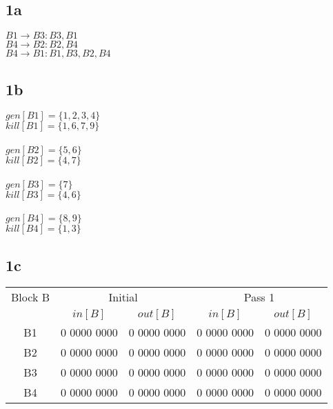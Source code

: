 \documentclass[10pt,a4paper]{article}
\author{Lucas Swartsenburg\\6174388}
\begin{document}
\subsection*{1a}
$B1 \rightarrow B3:{B3,B1}$ \\
$B4 \rightarrow B2:{B2,B4}$ \\
$B4 \rightarrow B1:{B1,B3,B2,B4}$

\subsection*{1b}
$gen[B1]= \{1,2,3,4\} $\\
$kill[B1]= \{1,6,7,9\} $\\
\\
$gen[B2]= \{5,6\} $\\
$kill[B2]= \{4,7\} $\\
\\
$gen[B3]= \{7\} $\\
$kill[B3]= \{4,6\} $\\
\\
$gen[B4]= \{8,9\} $\\
$kill[B4]= \{1,3\} $\\

\subsection*{1c}
\begin{tabular}{|c|c|c|c|c|}
\hline 
Block B   & \multicolumn{2}{|c|}{Initial}   & \multicolumn{2}{|c|}{Pass 1}     \\  \cline{2-5}
          & $in[B]$        & $out[B]$       & $in[B]$        & $out[B]$        \\ 
\hline    
B1        & 0 0000 0000    & 0 0000 0000    & 0 0000 0000    &  0 0000 0000    \\ 
B2        & 0 0000 0000    & 0 0000 0000    & 0 0000 0000    &  0 0000 0000    \\ 
B3        & 0 0000 0000    & 0 0000 0000    & 0 0000 0000    &  0 0000 0000    \\ 
B4        & 0 0000 0000    & 0 0000 0000    & 0 0000 0000    &  0 0000 0000    \\ 
\hline 
\end{tabular} 
\end{document}
